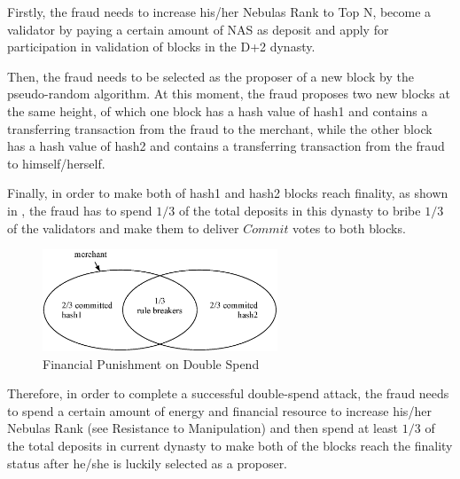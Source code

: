 Firstly, the fraud needs to increase his/her Nebulas Rank to Top N, become a validator by paying a certain amount of NAS as deposit and apply for participation in validation of blocks in the D+2 dynasty.


Then, the fraud needs to be selected as the proposer of a new block by the pseudo-random algorithm. At this moment, the fraud proposes two new blocks at the same height, of which one block has a hash value of hash1 and contains a transferring transaction from the fraud to the merchant, while the other block has a hash value of hash2 and contains a transferring transaction from the fraud to himself/herself.


Finally, in order to make both of hash1 and hash2 blocks reach finality, as shown in , the fraud has to spend $1/3$ of the total deposits in this dynasty to bribe $1/3$ of the validators and make them to deliver $Commit$ votes to both blocks.


\begin{figure}[h]
\centering
\includegraphics[width=7cm]{./figs/overlap}
\caption{Financial Punishment on Double Spend}
\label{fig:double_spend}
\end{figure}

Therefore, in order to complete a successful double-spend attack, the fraud needs to spend a certain amount of energy and financial resource to increase his/her Nebulas Rank (see  Resistance to Manipulation) and then spend at least $1/3$ of the total deposits in current dynasty to make both of the blocks reach the finality status after he/she is luckily selected as a proposer.


